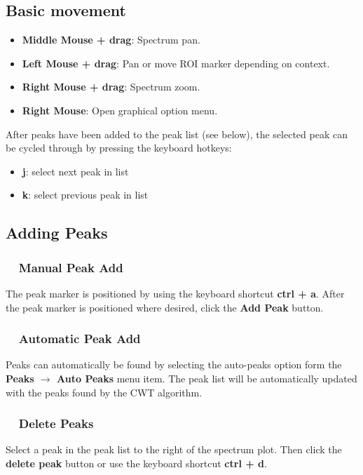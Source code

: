 \documentclass[10pt]{article}
\begin{document}
\subsection*{Basic movement}

\begin{itemize}
    \item \textbf{Middle Mouse + drag}:  Spectrum pan.
    \item \textbf{Left Mouse + drag}:  Pan or move ROI marker depending on context.
    \item \textbf{Right Mouse + drag}:  Spectrum zoom.
    \item \textbf{Right Mouse}: Open graphical option menu.
\end{itemize}

After peaks have been added to the peak list (see below), the selected peak can be
cycled through by pressing the keyboard hotkeys:
\begin{itemize}
    \item \textbf{j}: select next peak in list
    \item \textbf{k}: select previous peak in list
\end{itemize}

\subsection*{Adding Peaks}

\subsubsection*{\ \ Manual Peak Add}
The peak marker is positioned by using the keyboard shortcut \textbf{ctrl + a}.
After the peak marker is positioned where desired, click the \textbf{Add Peak} button.

\subsubsection*{\ \ Automatic Peak Add}
Peaks can automatically be found by selecting the auto-peaks option form the
\textbf{Peaks $\rightarrow$ Auto Peaks} menu item.  The peak list will be automatically updated
with the peaks found by the CWT algorithm.

\subsubsection*{\ \ Delete Peaks}
Select a peak in the peak list to the right of the spectrum plot.  Then click the
\textbf{delete peak} button or use the keyboard shortcut \textbf{ctrl + d}.
\end{document}
